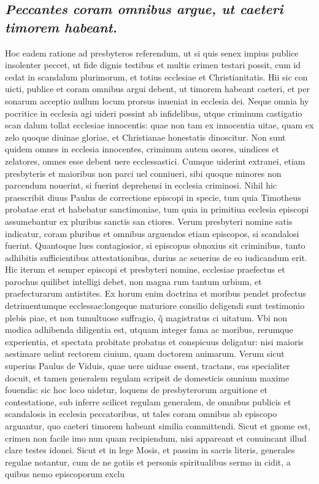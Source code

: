 \documentclass{article}
\begin{document}
\begin{pages}
\subsection*{\textit{Peccantes coram omnibus argue, ut caeteri timorem habeant. }}\pstart Hoc eadem ratione ad presbyteros referendum, ut si quis senex impius publice insolenter peccet, ut fide dignis testibus et multis crimen testari possit, cum id cedat in scandalum plurimorum, et totius ecclesiae et Christianitatis. Hii sic con uicti, publice et coram omnibus argui debent, ut timorem habeant caeteri, et per sonarum acceptio nullum locum prorsus inueniat in ecclesia dei. Neque omnia hy pocritice in ecclesia agi uideri possint ab infidelibus, utque criminum castigatio scan dalum tollat ecclesiae innocentis: quae non tam ex innocentia uitae, quam ex zelo quoque  diuinae gloriae, et Christianae honestatis dinoscitur. Non sunt quidem omnes in ecclesia innocentes, criminum autem osores, uindices et zelatores, omnes esse debent uere ecclessastici. Cumque uiderint extranei, etiam presbyteris et maioribus non parci uel conniueri, sibi quoque minores non parcendum nouerint, si fuerint deprehensi in ecclesia criminosi. Nihil hic praescribit diuus Paulus de correctione episcopi in specie, tum quia Timotheus probatae erat et habebatur sanctimoniae, tum quia in primitiua ecclesia episcopi assumebantur ex pluribus sanctis san ctiores. Verum presbyteri nomine satis indicatur, coram pluribus et omnibus arguendos etiam episcopos, si scandalosi fuerint. Quantoque lues contagiosior, si episcopus obnoxius sit criminibus, tanto adhibitis sufficientibus attestationibus, durius ac seuerius de eo iudicandum erit. Hic iterum et semper episcopi et presbyteri nomine, ecclesiae praefectus et parochus quilibet intelligi debet, non magna rum tantum urbium, et praefecturarum antistites. Ex horum enim doctrina et moribus pendet profectus detrimentumque ecclessae:longeque maturiore consilio deligendi sunt testimonio plebis piae, et non tumultuose suffragio, q̃ magistratus ci uitatum. Vbi non modica adhibenda diligentia est, utquam integer fama ac moribus, rerumque experientia, et spectata probitate probatus et conspicuus deligatur: nisi maioris aestimare uelint rectorem ciuium, quam doctorem animarum. Verum sicut superius Paulus de Viduis, quae uere uiduae essent, tractans, eas specialiter docuit, et tamen generalem regulam scripsit de domesticis omnium maxime fouendis: sic hoc loco uidetur, loquens de presbyterorum arguitione et contestatione, sub inferre scilicet regulam generalem, de omnibus publicis et scandalosis in ecclesia peccatoribus, ut tales coram omnibus ab episcopo arguantur, quo caeteri timorem habeant similia committendi. Sicut et gnome est, crimen non facile imo nun quam recipiendum, nisi appareant et conuincant illud clare testes idonei. Sicut et in lege Mosis, et passim in sacris literis, generales regulae notantur, cum de ne gotiis et personis spiritualibus sermo in cidit, a quibus nemo episcoporum exclu\pend

\end{pages}
\end{document}
